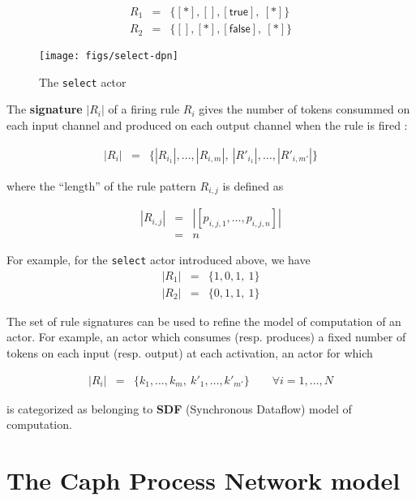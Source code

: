 \begin{eqnarray*}
  R_1 & = & \{ [*], [], [\mathsf{true}],\ [*] \} \\
  R_2 & = & \{ [], [*], [\mathsf{false}],\ [*] \}
\end{eqnarray*}

\begin{figure}[h]
  \centering
  \texttt{[image: figs/select-dpn]}
  \caption{The \texttt{select} actor}
  \label{fig:select-dpn}
\end{figure}

\medskip
\noindent
The \textbf{signature} $|R_i|$ of a firing rule $R_i$ gives the number of tokens consummed on each input
channel and produced on each output channel when the rule is fired :

\begin{eqnarray*}
  | R_i | & = & \{ |R_{i_1}|, \ldots, |R_{i,m}|,\ |R'_{i_1}|, \ldots, |R'_{i,m'}| \}
\end{eqnarray*}

where the ``length'' of the rule pattern $R_{i,j}$ is defined as 

\begin{eqnarray*}
  |R_{i,j}| & = & |[p_{i,j,1},\ldots,p_{i,j,n}]| \\
           & = & n
\end{eqnarray*}

\medskip
\noindent
For example, for the \texttt{select} actor introduced above, we have
\begin{eqnarray*}
  |R_1| & = & \{1, 0, 1,\ 1\} \\
  |R_2| & = & \{0, 1, 1,\ 1\}
\end{eqnarray*}

\bigskip
\noindent
The set of rule signatures can be used to refine the model of computation of an actor. For example,
an actor which consumes (resp. produces) a fixed number of tokens on each input (resp. output) at each activation, \ie an actor for
which

\begin{eqnarray*}
  |R_i| & = & \{ k_1, \ldots, k_m,\ k'_1, \ldots, k'_{m'} \} \qquad \forall i=1,\ldots,N
\end{eqnarray*}

is categorized as belonging to \textbf{SDF} (Synchronous Dataflow) model of computation.

\section{The Caph Process Network model}
\label{sec:caph-moc}

